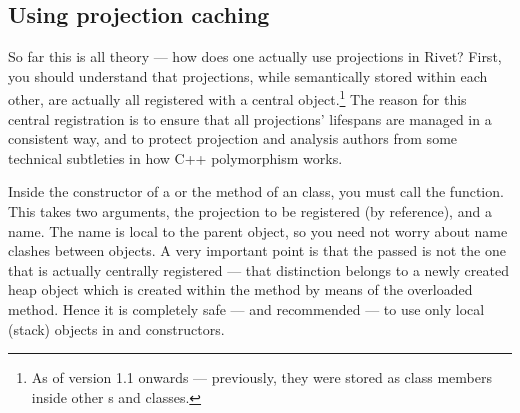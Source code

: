 \subsection{Using projection caching}
So far this is all theory --- how does one actually use projections in Rivet?
First, you should understand that projections, while semantically stored within
each other, are actually all registered with a central 
object.\footnote{As of version 1.1 onwards --- previously, they were stored as
  class members inside other s and  classes.}
The reason for this central registration is to ensure that all projections'
lifespans are managed in a consistent way, and to protect projection and
analysis authors from some technical subtleties in how C++ polymorphism works.

Inside the constructor of a  or the  method of an
 class, you must
call the  function. This takes two arguments, the projection
to be registered (by  reference), and a name. The name is local to
the parent object, so you need not worry about name clashes between objects. A
very important point is that the passed  is not the one that is
actually centrally registered --- that distinction belongs to a newly created
heap object which is created within the  method by means of
the overloaded  method. Hence it is completely safe
--- and recommended --- to use only local (stack) objects in 
and  constructors.


